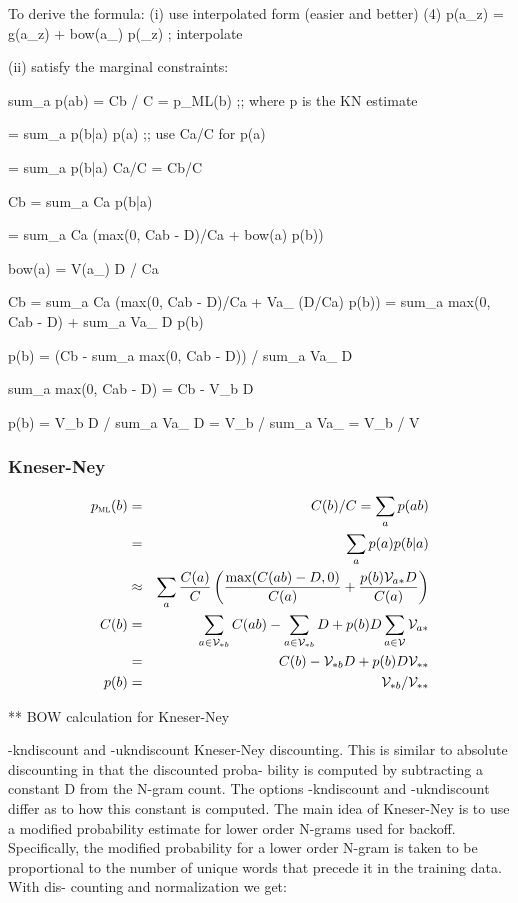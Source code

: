 \documentclass[ignorenonframetext]{beamer}
\newcommand{\vocab}{\mathcal{V}}
\newcommand{\pml}{p_{\textsc{ml}}}
\begin{document}
To derive the formula:
(i) use interpolated form (easier and better)
       (4)  p(a_z) = g(a_z) + bow(a_) p(_z)   ; interpolate

(ii) satisfy the marginal constraints:

  sum_a p(ab) = Cb / C = p_ML(b)   ;; where p is the KN estimate

= sum_a p(b|a) p(a)   ;; use Ca/C for p(a)

= sum_a p(b|a) Ca/C = Cb/C

Cb = sum_a Ca p(b|a) 

   = sum_a Ca (max(0, Cab - D)/Ca + bow(a) p(b))

bow(a) = V(a_) D / Ca

Cb = sum_a Ca (max(0, Cab - D)/Ca + Va_ (D/Ca) p(b))
   = sum_a max(0, Cab - D) + sum_a Va_ D p(b)

p(b) = (Cb - sum_a max(0, Cab - D)) / sum_a Va_ D

sum_a max(0, Cab - D) = Cb - V_b D

p(b) = V_b D / sum_a Va_ D = V_b / sum_a Va_ = V_b / V

\begin{frame}\frametitle{Kneser-Ney}
\begin{eqnarray*}
\pml(b) &=& C(b)/C = \sum_a p(ab) \\
&=& \sum_a p(a) p(b|a) \\
&\approx& \sum_a \frac{C(a)}{C} \left( \frac{\max(C(ab) - D, 0)}{C(a)}
+ \frac{p(b) \vocab_{a*} D}{C(a)} \right) \\
C(b) &=& \sum_{a\in\vocab_{*b}} C(ab) - \sum_{a\in\vocab_{*b}} D +
p(b) D \sum_{a\in\vocab} \vocab_{a*} \\
&=& C(b) - \vocab_{*b} D + p(b) D \vocab_{**} \\
p(b) &=& \vocab_{*b} / \vocab_{**} \\
\end{eqnarray*}
\end{frame}

** BOW calculation for Kneser-Ney

-kndiscount and -ukndiscount
       Kneser-Ney discounting.  This is similar to absolute discounting in that the discounted proba-
       bility is computed by subtracting a constant D from the N-gram count.  The options -kndiscount
       and -ukndiscount differ as to how this constant is computed.
       The  main idea of Kneser-Ney is to use a modified probability estimate for lower order N-grams
       used for backoff.  Specifically, the modified probability for a lower order N-gram is taken to
       be proportional to the number of unique words that precede it in the training data.  With dis-
       counting and normalization we get:
\end{document}
